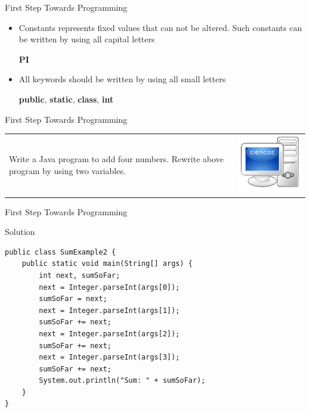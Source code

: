 \documentclass[14pt]{beamer}
\begin{document}
\begin{frame}[fragile]{First Step Towards Programming}
\begin{itemize}

  \item Constants represents fixed values that can not be altered. Such constants can be written by using all capital letters
  
  \textbf{PI}
  \item All keywords should be written by using all small letters
  
  \textbf{public}, \textbf{static}, \textbf{class}, \textbf{int}
 \end{itemize}
\end{frame}

\begin{frame}[fragile]{First Step Towards Programming}
\begin{tabular}{p{9cm} r}
 Write a Java program to add four numbers. Rewrite above program by using two variables. & \includegraphics[scale=.3]{exercise.png} \\
 \end{tabular}
\end{frame}

\begin{frame}[fragile]{First Step Towards Programming}
\begin{block}{Solution}
\begin{lstlisting}
public class SumExample2 {
    public static void main(String[] args) {
        int next, sumSoFar;
        next = Integer.parseInt(args[0]);
        sumSoFar = next;
        next = Integer.parseInt(args[1]);
        sumSoFar += next;
        next = Integer.parseInt(args[2]);
        sumSoFar += next;
        next = Integer.parseInt(args[3]);
        sumSoFar += next;
        System.out.println("Sum: " + sumSoFar);
    }
}
 \end{lstlisting}
 \end{block}
\end{frame}
\end{document}
